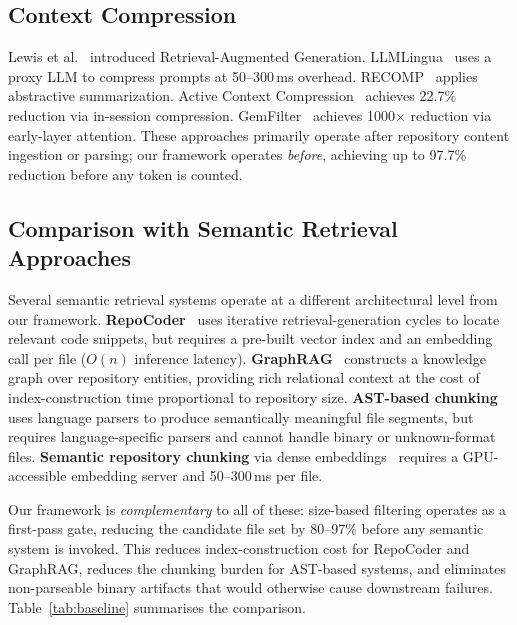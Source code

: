 \documentclass[conference]{IEEEtran}
\begin{document}
\subsection{Context Compression}
Lewis et al.~\cite{rag} introduced Retrieval-Augmented Generation.
LLMLingua~\cite{llmlingua} uses a proxy LLM to compress prompts at
50--300\,ms overhead. RECOMP~\cite{recomp} applies abstractive
summarization. Active Context Compression~\cite{acc} achieves 22.7\%
reduction via in-session compression. GemFilter~\cite{gemfilter}
achieves 1000$\times$ reduction via early-layer attention. These
approaches primarily operate after repository content ingestion or
parsing; our framework operates \emph{before}, achieving up to 97.7\%
reduction before any token is counted.

\subsection{Comparison with Semantic Retrieval Approaches}
\label{sec:baseline_comparison}

Several semantic retrieval systems operate at a different architectural
level from our framework.
\textbf{RepoCoder}~\cite{repocoder} uses iterative
retrieval-generation cycles to locate relevant code snippets, but
requires a pre-built vector index and an embedding call per file
($O(n)$ inference latency).
\textbf{GraphRAG}~\cite{graphrag} constructs a knowledge graph over
repository entities, providing rich relational context at the cost of
index-construction time proportional to repository size.
\textbf{AST-based chunking}~\cite{treesitter} uses language parsers to
produce semantically meaningful file segments, but requires
language-specific parsers and cannot handle binary or
unknown-format files.
\textbf{Semantic repository chunking} via dense
embeddings~\cite{codebert} requires a GPU-accessible embedding server
and 50--300\,ms per file.

Our framework is \emph{complementary} to all of these: size-based
filtering operates as a first-pass gate, reducing the candidate file
set by 80--97\% before any semantic system is invoked. This reduces
index-construction cost for RepoCoder and GraphRAG, reduces the
chunking burden for AST-based systems, and eliminates non-parseable
binary artifacts that would otherwise cause downstream failures.
Table~\ref{tab:baseline} summarises the comparison.
\end{document}
